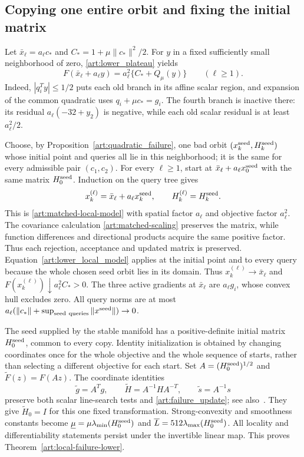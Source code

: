 \subsection{Copying one entire orbit and fixing the initial matrix}
Let $\bar x_\ell=a_\ell c_*$ and $C_*=1+\mu\|c_*\|^2/2$.
For $y$ in a fixed sufficiently small neighborhood of zero,
\eqref{art:lower_plateau} yields
\begin{equation}\label{art:lower_local_model}
 F(\bar x_\ell+a_\ell y)=a_\ell^2\{C_*+Q_\mu(y)\}\qquad(\ell\ge1).
\end{equation}
Indeed, $|q_i^Ty|\le1/2$ puts each old branch in its affine scalar
region, and expansion of the common quadratic uses $q_i+\mu c_*=g_i$.
The fourth branch is inactive there: its residual $a_\ell(-32+y_2)$ is
negative, while each old scalar residual is at least $a_\ell^2/2$.

Choose, by Proposition~\ref{art:quadratic_failure}, one bad orbit
$(x_k^{\rm seed},H_k^{\rm seed})$ whose initial point and queries all lie in this
neighborhood; it is the same for every admissible pair $(c_1,c_2)$.
For every $\ell\ge1$, start at $\bar x_\ell+a_\ell x_0^{\rm seed}$ with the same matrix
$H_0^{\rm seed}$. Induction on the query tree gives
\[
 x_k^{(\ell)}=\bar x_\ell+a_\ell x_k^{\rm seed},\qquad H_k^{(\ell)}=H_k^{\rm seed}.
\]
This is \eqref{art:matched-local-model} with spatial factor $a_\ell$
and objective factor $a_\ell^2$. The covariance calculation
\eqref{art:matched-scaling} preserves the matrix, while function
differences and directional products acquire the same positive factor.
Thus each rejection, acceptance and updated matrix is preserved. Equation~\eqref{art:lower_local_model} applies at the initial point and to every
query because the whole chosen seed orbit lies in its domain.
Thus $x_k^{(\ell)}\to \bar x_\ell$ and
${F(x_k^{(\ell)})\downarrow a_\ell^2C_*>0}$. The three active gradients at
$\bar x_\ell$ are $a_\ell g_i$, whose convex hull excludes zero.
All query norms are at most
$a_\ell(\|c_*\|+\sup_{\rm seed\ queries}\|x^{\rm seed}\|)\to0$.

The seed supplied by the stable manifold has a positive-definite initial
matrix $H_0^{\rm seed}$, common to every copy. Identity initialization is
obtained by changing coordinates once for the whole objective and the
whole sequence of starts, rather than selecting a different objective
for each start. Set $A=(H_0^{\rm seed})^{1/2}$ and $\widetilde F(z)=F(Az)$.
The coordinate identities
\[
 \widetilde g=A^Tg,\qquad \widetilde H=A^{-1}HA^{-T},\qquad
 \widetilde s=A^{-1}s
\]
preserve both scalar line-search tests and
\eqref{art:failure_update}; see also~\cite[Section~2]{LO}.
They give $\widetilde H_0=I$ for this one fixed transformation.
Strong-convexity and smoothness constants become
$\underline\mu=\mu\lambda_{\min}(H_0^{\rm seed})$ and
$\overline L=512\lambda_{\max}(H_0^{\rm seed})$.
All locality and differentiability statements persist under the
invertible linear map. This proves
Theorem~\ref{art:local-failure-lower}.
